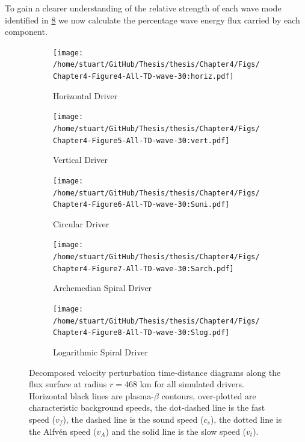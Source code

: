 \documentclass[a4paper,12pt,fourier,authoryear,custommargin]{Classes/PhDThesisPSnPDF}
\begin{document}
To gain a clearer understanding of the relative strength of each wave mode identified in \cref{fig:All-TD-wave-30} we now calculate the percentage wave energy flux carried by each component.




\begin{figure}
    \centering
    

    \begin{subfigure}[b]{0.9\columnwidth}
        \texttt{[image: /home/stuart/GitHub/Thesis/thesis/Chapter4/Figs/Chapter4-Figure4-All-TD-wave-30:horiz.pdf]}
        \caption{Horizontal Driver}
        \label{fig:All-TD-wave-30:horiz}
    \end{subfigure}

    \begin{subfigure}[b]{0.9\columnwidth}
        \texttt{[image: /home/stuart/GitHub/Thesis/thesis/Chapter4/Figs/Chapter4-Figure5-All-TD-wave-30:vert.pdf]}
        \caption{Vertical Driver}
        \label{fig:All-TD-wave-30:vert}
    \end{subfigure}
    \caption{}
    \label{fig:}
\end{figure}

\begin{figure}
    \centering
\ContinuedFloat
    

    \begin{subfigure}[b]{0.9\columnwidth}
        \texttt{[image: /home/stuart/GitHub/Thesis/thesis/Chapter4/Figs/Chapter4-Figure6-All-TD-wave-30:Suni.pdf]}
        \caption{Circular Driver}
        \label{fig:All-TD-wave-30:Suni}
    \end{subfigure}

    \begin{subfigure}[b]{0.9\columnwidth}
        \texttt{[image: /home/stuart/GitHub/Thesis/thesis/Chapter4/Figs/Chapter4-Figure7-All-TD-wave-30:Sarch.pdf]}
        \caption{Archemedian Spiral Driver}
        \label{fig:All-TD-wave-30:Sarch}
    \end{subfigure}
    \caption{}
    \label{fig:}
\end{figure}

\begin{figure}
    \centering
\ContinuedFloat
    

    \begin{subfigure}[b]{0.9\columnwidth}
        \texttt{[image: /home/stuart/GitHub/Thesis/thesis/Chapter4/Figs/Chapter4-Figure8-All-TD-wave-30:Slog.pdf]}
        \caption{Logarithmic Spiral Driver}
        \label{fig:All-TD-wave-30:Slog}
    \end{subfigure}
    \caption{Decomposed velocity perturbation time-distance diagrams along the flux surface at radius $r = 468$ km for all simulated drivers. Horizontal black lines are plasma-$\beta$ contours, over-plotted are characteristic background speeds, the dot-dashed line is the fast speed ($v_f$), the dashed line is the sound speed ($c_s$), the dotted line is the Alfv\'en speed ($v_A$) and the solid line is the slow speed ($v_t$).}
    \label{fig:All-TD-wave-30}
\end{figure}
\end{document}
